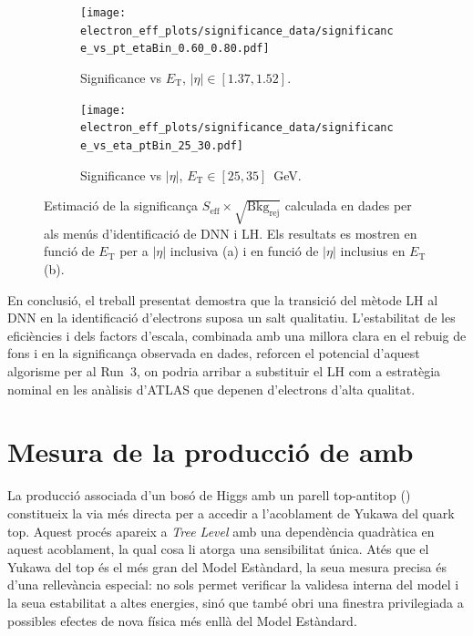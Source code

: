 \begin{figure}[h]
  \centering

  \begin{subfigure}{0.48\textwidth}
    \centering
    \texttt{[image: electron\_eff\_plots/significance\_data/significance\_vs\_pt\_etaBin\_0.60\_0.80.pdf]}
    \caption{\small{Significance vs $E_{\mathrm{T}}$, $|\eta|\in[1.37,1.52]$.}}
    \label{res:significance_vs_pt_etaBin}
  \end{subfigure}\hfill
  \begin{subfigure}{0.48\textwidth}
    \centering
    \texttt{[image: electron\_eff\_plots/significance\_data/significance\_vs\_eta\_ptBin\_25\_30.pdf]}
    \caption{\small{Significance vs $|\eta|$, $E_{\mathrm{T}}\in[25,35]$~GeV.}}
    \label{res:significance_vs_eta_ptBin}
  \end{subfigure}

  \caption{Estimació de la significança $S_{\mathrm{eff}} \times \sqrt{\mathrm{Bkg}_{\mathrm{rej}}}$ 
  calculada en dades per als menús d’identificació de DNN i LH.  
  Els resultats es mostren en funció de $E_{\mathrm{T}}$ per a $|\eta|$ inclusiva (a) i en funció de $|\eta|$ inclusius en $E_{\mathrm{T}}$ (b).}
  \label{res:significance_bins}
\end{figure}


En conclusió, el treball presentat demostra que la transició del mètode LH al DNN en la identificació d’electrons suposa un salt qualitatiu.  
L’estabilitat de les eficiències i dels factors d’escala, combinada amb una millora clara en el rebuig de fons i en la significança observada en dades, reforcen el potencial d’aquest algorisme per al Run~3, on podria arribar a substituir el LH com a estratègia nominal en les anàlisis d’ATLAS que depenen d’electrons d’alta qualitat.

\FloatBarrier

\section*{Mesura de la producció de \ttH amb \htautau}

La producció associada d’un bosó de Higgs amb un parell top-antitop (\ttH) constitueix la via més directa per a accedir a l’acoblament de Yukawa del quark top.  
Aquest procés apareix a \textit{Tree Level} amb una dependència quadràtica en aquest acoblament, la qual cosa li atorga una sensibilitat única.  
Atés que el Yukawa del top és el més gran del Model Estàndard, la seua mesura precisa és d’una rellevància especial: no sols permet verificar la validesa interna del model i la seua estabilitat a altes energies, sinó que també obri una finestra privilegiada a possibles efectes de nova física més enllà del Model Estàndard.  

